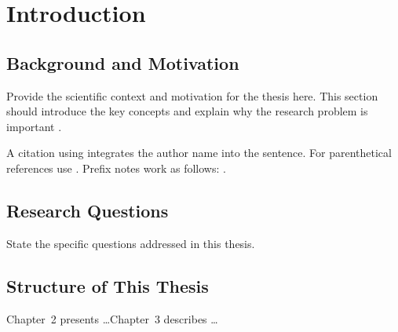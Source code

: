 \chapter{Introduction}

\section{Background and Motivation}\label{sec:intro_motivation}

Provide the scientific context and motivation for the thesis here.
This section should introduce the key concepts and explain why the
research problem is important \citep{example:2020}.

A citation using \citet{example:2021} integrates the author name into
the sentence. For parenthetical references use \citep{example:2020}.
Prefix notes work as follows: \citep[e.g.,][]{example:2020}.

\section{Research Questions}\label{sec:intro_questions}

State the specific questions addressed in this thesis.

\section{Structure of This Thesis}\label{sec:intro_structure}

Chapter~2 presents \ldots Chapter~3 describes \ldots
